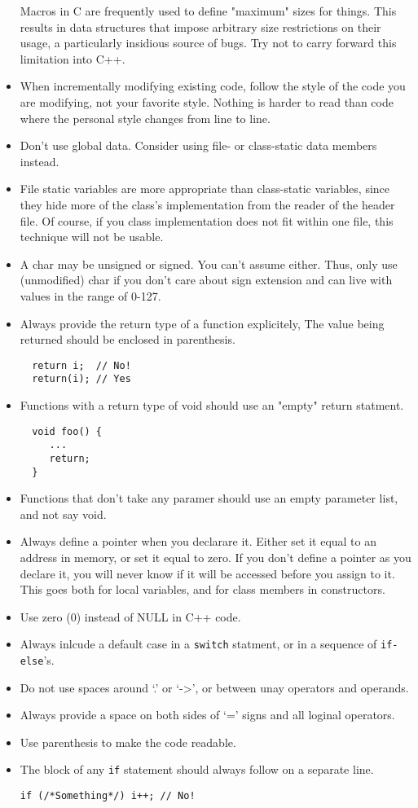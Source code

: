 \documentclass[10pt,letter,relax]{SANDreport}
\begin{document}
\begin{itemize}
  Macros in C are frequently used to define "maximum" sizes for things.
  This results in data structures that impose arbitrary size
  restrictions on their usage, a particularly insidious source of bugs.
  Try not to carry forward this limitation into C++.
\item When incrementally modifying existing code, follow the style of the code you are modifying, not your favorite style. Nothing is harder to read than code where the personal style changes from line to line.
\item Don't use global data. Consider using file- or class-static data members instead.
\item File static variables are more appropriate than class-static
  variables, since they hide more of the class's implementation from the
  reader of the header file. Of course, if you class implementation does
  not fit within one file, this technique will not be usable.
\item A char may be unsigned or signed. You can't assume either. Thus,
  only use (unmodified) char if you don't care about sign extension and
  can live with values in the range of 0-127.
\item Always provide the return type of a function explicitely, The value
  being returned should be enclosed in parenthesis.
  \begin{verbatim}
  return i;  // No!
  return(i); // Yes
  \end{verbatim}
\item Functions with a return type of void should use an "empty" return
  statment.
  \begin{verbatim}
  void foo() {
     ...
     return;
  }
  \end{verbatim}
\item Functions that don't take any paramer should use an empty parameter
list, and not say void.
\item Always define a pointer when you  declarare it. Either set it equal to
an address in memory, or set it equal to zero. If you don't define a pointer
as you declare it, you will never know if it will be accessed before you
assign to it. This goes both for local variables, and for class members in
constructors.
\item Use zero (0) instead of NULL in C++ code.
\item Always inlcude a default case in a \verb!switch! statment, or in a
sequence of \verb!if-else!'s.
\item Do not use spaces around `.' or `->', or between unay operators and
operands.
\item Always provide a space on both sides of `=' signs and all loginal
operators.
\item Use parenthesis to make the code readable.
\item The block of any \verb!if! statement should always follow on a separate
line.
\begin{verbatim}
if (/*Something*/) i++; // No!


\end{verbatim}
\end{itemize}
\end{document}
